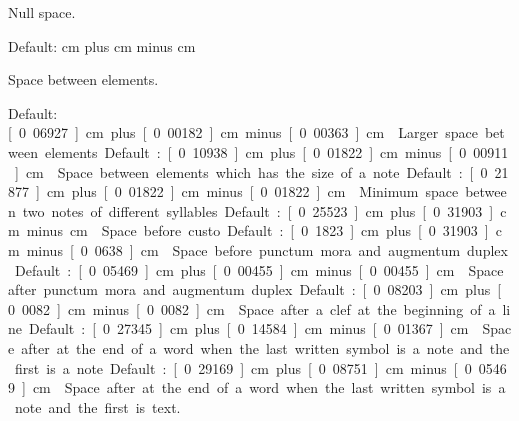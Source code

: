 Null space.  

Default: \unit[0]{cm} plus \unit[0]{cm} minus \unit[0]{cm}

Space between elements.  

Default: \unit[0.06927]{cm} plus \unit[0.00182]{cm} minus \unit[0.00363]{cm}

Larger space between elements.  

Default: \unit[0.10938]{cm} plus \unit[0.01822]{cm} minus \unit[0.00911]{cm}

Space between elements which has the size of a note.  

Default: \unit[0.21877]{cm} plus \unit[0.01822]{cm} minus \unit[0.01822]{cm}

Minimum space between two notes of different syllables.  

Default: \unit[0.25523]{cm} plus \unit[0.31903]{cm} minus \unit[0]{cm}

Space before custo.  

Default: \unit[0.1823]{cm} plus \unit[0.31903]{cm} minus \unit[0.0638]{cm}

Space before punctum mora and augmentum duplex.  

Default: \unit[0.05469]{cm} plus \unit[0.00455]{cm} minus \unit[0.00455]{cm}

Space after punctum mora and augmentum duplex.  

Default: \unit[0.08203]{cm} plus \unit[0.0082]{cm} minus \unit[0.0082]{cm}

Space after a clef at the beginning of a line.  

Default: \unit[0.27345]{cm} plus \unit[0.14584]{cm} minus \unit[0.01367]{cm}

Space after at the end of a word when the last written symbol is a note and the first is a note.  

Default: \unit[0.29169]{cm} plus \unit[0.08751]{cm} minus \unit[0.05469]{cm}

Space after at the end of a word when the last written symbol is a note and the first is text.  

